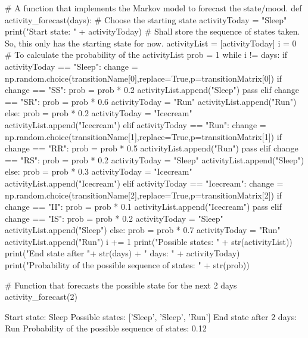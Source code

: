 \begin{ipython}
# A function that implements the Markov model to forecast the state/mood.
def activity_forecast(days):
    # Choose the starting state
    activityToday = "Sleep"
    print("Start state: " + activityToday)
    # Shall store the sequence of states taken. So, this only has the starting state for now.
    activityList = [activityToday]
    i = 0
    # To calculate the probability of the activityList
    prob = 1
    while i != days:
        if activityToday == "Sleep":
            change = np.random.choice(transitionName[0],replace=True,p=transitionMatrix[0])
            if change == "SS":
                prob = prob * 0.2
                activityList.append("Sleep")
                pass
            elif change == "SR":
                prob = prob * 0.6
                activityToday = "Run"
                activityList.append("Run")
            else:
                prob = prob * 0.2
                activityToday = "Icecream"
                activityList.append("Icecream")
        elif activityToday == "Run":
            change = np.random.choice(transitionName[1],replace=True,p=transitionMatrix[1])
            if change == "RR":
                prob = prob * 0.5
                activityList.append("Run")
                pass
            elif change == "RS":
                prob = prob * 0.2
                activityToday = "Sleep"
                activityList.append("Sleep")
            else:
                prob = prob * 0.3
                activityToday = "Icecream"
                activityList.append("Icecream")
        elif activityToday == "Icecream":
            change = np.random.choice(transitionName[2],replace=True,p=transitionMatrix[2])
            if change == "II":
                prob = prob * 0.1
                activityList.append("Icecream")
                pass
            elif change == "IS":
                prob = prob * 0.2
                activityToday = "Sleep"
                activityList.append("Sleep")
            else:
                prob = prob * 0.7
                activityToday = "Run"
                activityList.append("Run")
        i += 1  
    print("Possible states: " + str(activityList))
    print("End state after "+ str(days) + " days: " + activityToday)
    print("Probability of the possible sequence of states: " + str(prob))

# Function that forecasts the possible state for the next 2 days
activity_forecast(2)
\end{ipython}
\begin{ioutput}
Start state: Sleep
Possible states: ['Sleep', 'Sleep', 'Run']
End state after 2 days: Run
Probability of the possible sequence of states: 0.12
\end{ioutput}

